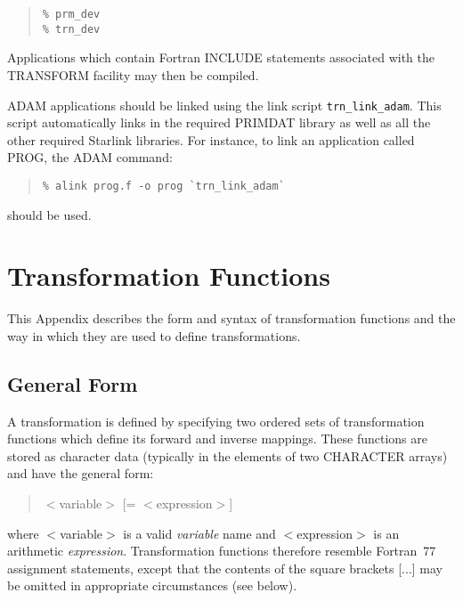 \documentclass[twoside,11pt]{article}
\newcommand{\xlabel}[1]{}
\newcommand{\name}[1]{\mbox{\small{#1}}}
\begin{document}
\begin{quote}
\begin{verbatim}
% prm_dev
% trn_dev
\end{verbatim}
\end{quote}

Applications which contain Fortran \name{INCLUDE} statements associated with 
the \name{TRANSFORM} facility may then be compiled. 

ADAM applications should be linked using the link script 
\texttt{trn\_link\_adam}.
This script automatically links in the required \name{PRIMDAT} library as
well as all the other required Starlink libraries.
For instance, to link an application called \name{PROG}, the \name{ADAM}
command: 

\begin{quote}
\begin{verbatim}
% alink prog.f -o prog `trn_link_adam`
\end{verbatim}
\end{quote}

should be used.

\cleardoublepage
\appendix

\section{\xlabel{appendix_transformation_functions}Transformation Functions}

\label{appendix_syntax}

This Appendix describes the form and syntax of transformation functions and
the way in which they are used to define transformations. 


\subsection{\xlabel{general_form}General Form}

A transformation is defined by specifying two ordered sets of transformation
functions which define its forward and inverse mappings. 
These functions are stored as character data (typically in the elements of
two \name{CHARACTER} arrays) and have the general form: 

\begin{quote}
$<$variable$>$ [= $<$expression$>$]
\end{quote}

where \mbox{$<$variable$>$} is a valid \emph{variable} name and
\mbox{$<$expression$>$} is an arithmetic \emph{expression}. 
Transformation functions therefore resemble Fortran~77 assignment
statements, except that the contents of the square brackets \mbox{[...]} may
be omitted in appropriate circumstances (see below). 
\end{document}
